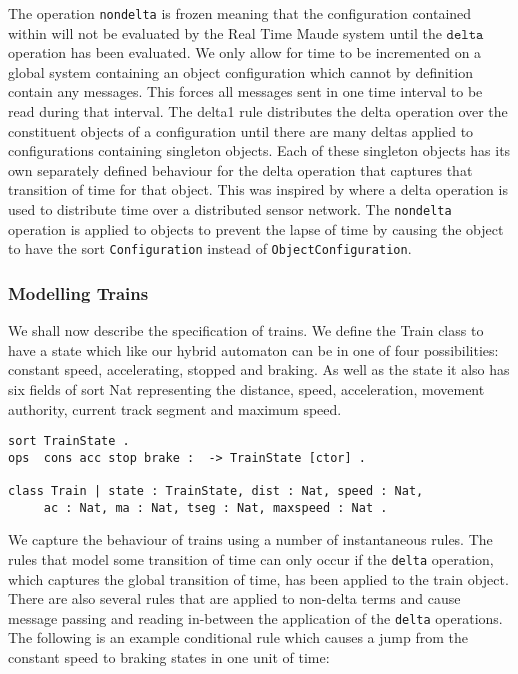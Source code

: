 The operation \texttt{nondelta} is frozen meaning that the configuration contained within will not be evaluated by the Real Time Maude system until the $\texttt{delta}$ operation has been evaluated. We only allow for time to be incremented on a global system containing an object configuration which cannot by definition contain any messages. This forces all messages sent in one time interval to be read during that interval. The delta1 rule distributes the delta operation over the constituent objects of a configuration until there are many deltas applied to configurations containing singleton objects. Each of these singleton objects has its own separately defined behaviour for the delta operation that captures that transition of time for that object. This was inspired by  \cite{PO07} where a delta operation is used to distribute time over a distributed sensor network. The \texttt{nondelta} operation is applied to objects to prevent the lapse of time by causing the object to have the sort \texttt{Configuration} instead of \texttt{ObjectConfiguration}.

\subsubsection*{Modelling Trains}
We shall now describe the specification of trains. We define the Train class to have a state which like our hybrid automaton can be in one of four possibilities: constant speed, accelerating, stopped and braking. As well as the state it also has six fields of sort Nat representing the distance, speed, acceleration, movement authority,  current track segment and maximum speed.

\begin{lstlisting}
sort TrainState .
ops  cons acc stop brake :  -> TrainState [ctor] .

class Train | state : TrainState, dist : Nat, speed : Nat, 
     ac : Nat, ma : Nat, tseg : Nat, maxspeed : Nat .
\end{lstlisting}

We capture the behaviour of trains using a number of instantaneous rules. The rules that model some transition of time can only occur if the \texttt{delta} operation, which captures the global transition of time, has been applied to the train object. There are also several rules that are applied to non-delta terms and cause message passing and reading in-between the application of the \texttt{delta} operations. The following is an example conditional rule which causes a jump from the constant speed to braking states in one unit of time:

